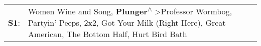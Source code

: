 \begin{supertabular}{p{0.03\textwidth}p{0.92\textwidth}}
 \textbf{S1}:  &  Women Wine and Song\textsuperscript{}, \enspace \textbf{Plunger\textsuperscript{$\wedge$}} \textgreater \enspace Professor Wormbog\textsuperscript{}, \enspace Partyin' Peeps\textsuperscript{}, \enspace 2x2\textsuperscript{}, \enspace Got Your Milk (Right Here)\textsuperscript{}, \enspace Great American\textsuperscript{}, \enspace The Bottom Half\textsuperscript{}, \enspace Hurt Bird Bath\textsuperscript{}  \enspace  \\
\end{supertabular}
